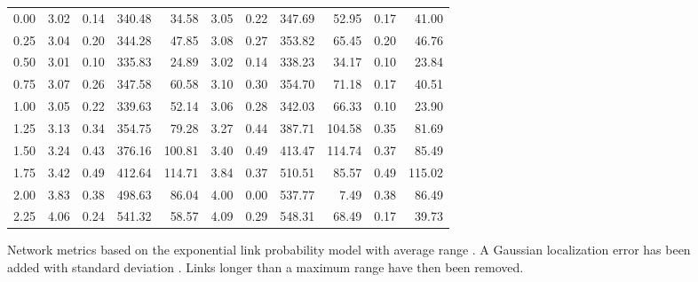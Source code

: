 \documentclass{article}
\begin{document}
\begin{figure}[h]
\begin{center}
\begin{tabular}{|r|rr|rr|rr|rr|rr|}
0.00 & 3.02 & 0.14 & 340.48 &  34.58 & 3.05 & 0.22 & 347.69 &  52.95 & 0.17 & 41.00\\
0.25 & 3.04 & 0.20 & 344.28 &  47.85 & 3.08 & 0.27 & 353.82 &  65.45 & 0.20 & 46.76\\
0.50 & 3.01 & 0.10 & 335.83 &  24.89 & 3.02 & 0.14 & 338.23 &  34.17 & 0.10 & 23.84\\
0.75 & 3.07 & 0.26 & 347.58 &  60.58 & 3.10 & 0.30 & 354.70 &  71.18 & 0.17 & 40.51\\
1.00 & 3.05 & 0.22 & 339.63 &  52.14 & 3.06 & 0.28 & 342.03 &  66.33 & 0.10 & 23.90\\
1.25 & 3.13 & 0.34 & 354.75 &  79.28 & 3.27 & 0.44 & 387.71 & 104.58 & 0.35 & 81.69\\
1.50 & 3.24 & 0.43 & 376.16 & 100.81 & 3.40 & 0.49 & 413.47 & 114.74 & 0.37 & 85.49\\
1.75 & 3.42 & 0.49 & 412.64 & 114.71 & 3.84 & 0.37 & 510.51 &  85.57 & 0.49 & 115.02\\
2.00 & 3.83 & 0.38 & 498.63 &  86.04 & 4.00 & 0.00 & 537.77 &   7.49 & 0.38 & 86.49\\
2.25 & 4.06 & 0.24 & 541.32 &  58.57 & 4.09 & 0.29 & 548.31 &  68.49 & 0.17 & 39.73\\
\hline
\end{tabular}
\caption{Network metrics based on the exponential link probability model with average range . A Gaussian localization error has been added with standard deviation . Links longer than a maximum range  have then been removed.}
\label{exp_exp_r_e}
\end{center}
\end{figure}
\end{document}
